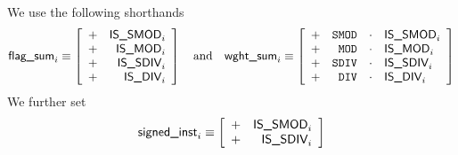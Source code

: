 We use the following shorthands
\[
	\textsf{flag\_sum}_{i}
	\equiv
	\left[ \begin{array}{cr}
		+ & \textsf{IS\_SMOD}    _{i}   \\
		+ & \textsf{IS\_MOD}     _{i}   \\
		+ & \textsf{IS\_SDIV}    _{i}   \\
		+ & \textsf{IS\_DIV}     _{i}   \\
	\end{array} \right]
	\quad\text{and}\quad
	\textsf{wght\_sum}_{i}
	\equiv
	\left[ \begin{array}{crcl}
		+ & \texttt{SMOD}           & \cdot & \textsf{IS\_SMOD}    _{i}   \\
		+ & \texttt{MOD}            & \cdot & \textsf{IS\_MOD}     _{i}   \\
		+ & \texttt{SDIV}           & \cdot & \textsf{IS\_SDIV}    _{i}   \\
		+ & \texttt{DIV}            & \cdot & \textsf{IS\_DIV}     _{i}   \\
	\end{array} \right]
\]
We further set
\[
	\textsf{signed\_inst}_{i}
	\equiv
	\left[ \begin{array}{cr}
		+ & \textsf{IS\_SMOD}    _{i}   \\
		+ & \textsf{IS\_SDIV}    _{i}   \\
	\end{array} \right]
\]

